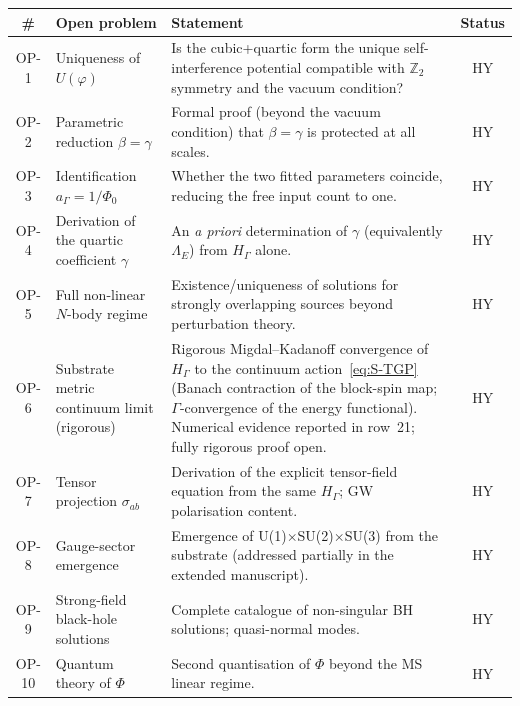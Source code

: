 \documentclass[11pt,a4paper]{article}
\renewcommand{\Phi}{\varPhi}
\newcommand{\PhiZero}{\varPhi_{0}}
\newcommand{\Zp}{\mathbb{Z}_{2}}
\begin{document}
\begin{center}\small
\begin{longtable}{@{}clp{8.5cm}c@{}}
\toprule
\# & \textbf{Open problem} & \textbf{Statement} & \textbf{Status}\\
\midrule
\endhead
OP-1 & Uniqueness of $U(\varphi)$
  & Is the cubic+quartic form the unique self-interference potential
  compatible with $\Zp$ symmetry and the vacuum condition?
  & \textsf{HY}\\
OP-2 & Parametric reduction $\beta=\gamma$
  & Formal proof (beyond the vacuum condition) that $\beta=\gamma$ is
  protected at all scales.
  & \textsf{HY}\\
OP-3 & Identification $a_{\Gamma}=1/\PhiZero$
  & Whether the two fitted parameters coincide, reducing the free input
  count to one.
  & \textsf{HY}\\
OP-4 & Derivation of the quartic coefficient $\gamma$
  & An \textit{a priori} determination of $\gamma$ (equivalently
  $\Lambda_{E}$) from $H_{\Gamma}$ alone.
  & \textsf{HY}\\
OP-5 & Full non-linear $N$-body regime
  & Existence/uniqueness of solutions for strongly overlapping sources
  beyond perturbation theory.
  & \textsf{HY}\\
OP-6 & Substrate metric continuum limit (rigorous)
  & Rigorous Migdal--Kadanoff convergence of $H_{\Gamma}$ to the continuum
  action~\eqref{eq:S-TGP} (Banach contraction of the block-spin map;
  $\Gamma$-convergence of the energy functional). Numerical evidence
  reported in row~21; fully rigorous proof open.
  & \textsf{HY}\\
OP-7 & Tensor projection $\sigma_{ab}$
  & Derivation of the explicit tensor-field equation from the same
  $H_{\Gamma}$; GW polarisation content.
  & \textsf{HY}\\
OP-8 & Gauge-sector emergence
  & Emergence of U(1)$\times$SU(2)$\times$SU(3) from the substrate
  (addressed partially in the extended manuscript).
  & \textsf{HY}\\
OP-9 & Strong-field black-hole solutions
  & Complete catalogue of non-singular BH solutions; quasi-normal modes.
  & \textsf{HY}\\
OP-10 & Quantum theory of $\Phi$
  & Second quantisation of $\Phi$ beyond the MS linear regime.
  & \textsf{HY}\\
\bottomrule
\end{longtable}
\end{center}

\end{document}
